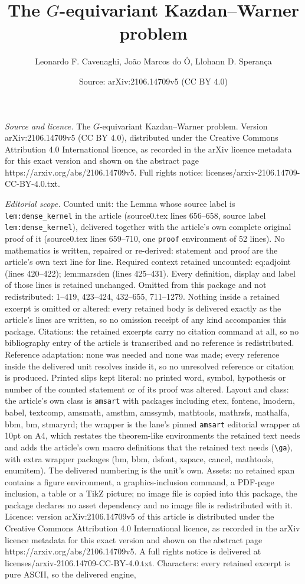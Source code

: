 \documentclass[10pt,a4paper]{amsart}
\title[The $G$-equivariant Kazdan--Warner problem]{The $G$-equivariant Kazdan--Warner problem}
\author{Leonardo F. Cavenaghi, Jo\~ao Marcos do \'O, Llohann D. Speran\c{c}a}
\date{Source: arXiv:2106.14709v5 (CC BY 4.0)}
\begin{document}
\maketitle

\noindent\emph{Source and licence.} The $G$-equivariant Kazdan--Warner problem. Version arXiv:2106.14709v5 (CC BY 4.0), distributed under the Creative Commons Attribution 4.0 International licence, as recorded in the arXiv licence metadata for this exact version and shown on the abstract page https://arxiv.org/abs/2106.14709v5. Full rights notice: licenses/arxiv-2106.14709-CC-BY-4.0.txt.\par\smallskip

\noindent\textit{Editorial scope.} Counted unit: the Lemma whose source label is \texttt{lem:dense\_kernel} in the article (source0.tex lines 656--658, source label \texttt{lem:dense\_kernel}), delivered together with the article's own complete original proof of it (source0.tex lines 659--710, one \texttt{proof} environment of 52 lines). No mathematics is written, repaired or re-derived: statement and proof are the article's own text line for line. Required context retained uncounted: eq:adjoint (lines 420--422); lem:marsden (lines 425--431). Every definition, display and label of those lines is retained unchanged. Omitted from this package and not redistributed: 1--419, 423--424, 432--655, 711--1279. Nothing inside a retained excerpt is omitted or altered: every retained body is delivered exactly as the article's lines are written, so no omission receipt of any kind accompanies this package. Citations: the retained excerpts carry no citation command at all, so no bibliography entry of the article is transcribed and no reference is redistributed. Reference adaptation: none was needed and none was made; every reference inside the delivered unit resolves inside it, so no unresolved reference or citation is produced. Printed slips kept literal: no printed word, symbol, hypothesis or number of the counted statement or of its proof was altered. Layout and class: the article's own class is \texttt{amsart} with packages including etex, fontenc, lmodern, babel, textcomp, amsmath, amsthm, amssymb, mathtools, mathrsfs, mathalfa, bbm, bm, stmaryrd; the wrapper is the lane's pinned \texttt{amsart} editorial wrapper at 10pt on A4, which restates the theorem-like environments the retained text needs and adds the article's own macro definitions that the retained text needs (\texttt{\textbackslash ga}), with extra wrapper packages (bm, bbm, dsfont, xspace, cancel, mathtools, enumitem). The delivered numbering is the unit's own. Assets: no retained span contains a figure environment, a graphics-inclusion command, a PDF-page inclusion, a table or a TikZ picture; no image file is copied into this package, the package declares no asset dependency and no image file is redistributed with it. Licence: version arXiv:2106.14709v5 of this article is distributed under the Creative Commons Attribution 4.0 International licence, as recorded in the arXiv licence metadata for this exact version and shown on the abstract page https://arxiv.org/abs/2106.14709v5. A full rights notice is delivered at licenses/arxiv-2106.14709-CC-BY-4.0.txt. Characters: every retained excerpt is pure ASCII, so the delivered engine, 
\end{document}
